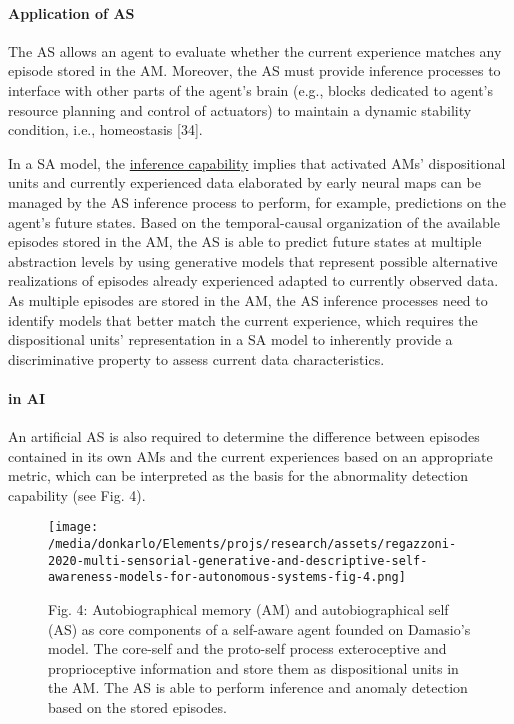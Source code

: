 \documentclass{article}
\begin{document}
			\paragraph{Application of AS}The AS allows an agent to evaluate whether the current experience matches any episode stored in the AM.  Moreover, the AS must provide inference processes to interface with other
			parts of the agent’s brain (e.g., blocks dedicated to agent’s
			resource planning and control of actuators) to maintain a
			dynamic stability condition, i.e., homeostasis \citet{regazzoni-2020-multi-sensorial-generative-and-descriptive-self-awareness-models-for-autonomous-systems}[34]. 
			
			In a SA model, the \underline{inference capability} implies that activated AMs’ dispositional units and currently experienced data elaborated by early neural maps can be managed by the AS inference process to perform, for example, predictions on the agent’s future states. Based on the temporal-causal organization of the available episodes stored in the AM, the AS is able to
			predict future states at multiple abstraction levels by using generative models that represent possible alternative realizations of episodes already experienced adapted to currently observed data. As multiple episodes are stored in the AM, the AS inference processes need to identify models that better match the current experience, which requires the dispositional units’ representation in a SA model to inherently provide a discriminative property to assess current data characteristics.
			
			
			\paragraph{in AI} An artificial AS is also required to determine the difference
			between episodes contained in its own AMs and the current
			experiences based on an appropriate metric, which can be interpreted as the basis for the abnormality detection capability
			(see Fig. 4). 
			\begin{figure*}
				\centering
				\texttt{[image: /media/donkarlo/Elements/projs/research/assets/regazzoni-2020-multi-sensorial-generative-and-descriptive-self-awareness-models-for-autonomous-systems-fig-4.png]}
				\caption{Fig. 4: Autobiographical memory (AM) and autobiographical self (AS) as core components of a self-aware agent founded on Damasio’s model. The core-self and the proto-self process exteroceptive and proprioceptive information and store them as dispositional units in the AM. The AS is able to perform inference and anomaly detection based on the stored episodes.
				}
				\label{fig:regazzoni-2020-multi-sensorial-generative-and-descriptive-self-awareness-models-for-autonomous-systems-fig-4.png}
			\end{figure*}
			
\end{document}
